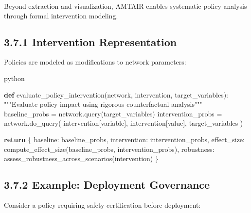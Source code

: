 \documentclass[
  11pt,
  letterpaper,
]{book}
\newenvironment{Shaded}{\begin{snugshade}}{\end{snugshade}}
\newcommand{\CommentTok}[1]{\textcolor[rgb]{0.37,0.37,0.37}{#1}}
\newcommand{\ControlFlowTok}[1]{\textcolor[rgb]{0.00,0.23,0.31}{\textbf{#1}}}
\newcommand{\KeywordTok}[1]{\textcolor[rgb]{0.00,0.23,0.31}{\textbf{#1}}}
\newcommand{\NormalTok}[1]{\textcolor[rgb]{0.00,0.23,0.31}{#1}}
\newcommand{\OperatorTok}[1]{\textcolor[rgb]{0.37,0.37,0.37}{#1}}
\newcommand{\StringTok}[1]{\textcolor[rgb]{0.13,0.47,0.30}{#1}}
\begin{document}

Beyond extraction and visualization, AMTAIR enables systematic policy
analysis through formal intervention modeling.

\subsection*{3.7.1 Intervention
Representation}\label{sec-intervention-representation}

Policies are modeled as modifications to network parameters:

python

\begin{Shaded}
\begin{Highlighting}[]
\KeywordTok{def}\NormalTok{ evaluate\_policy\_intervention(network, intervention, target\_variables):}
    \CommentTok{"""Evaluate policy impact using rigorous counterfactual analysis"""}
\NormalTok{    baseline\_probs }\OperatorTok{=}\NormalTok{ network.query(target\_variables)}
\NormalTok{    intervention\_probs }\OperatorTok{=}\NormalTok{ network.do\_query(}
\NormalTok{        intervention[}\StringTok{\textquotesingle{}variable\textquotesingle{}}\NormalTok{], }
\NormalTok{        intervention[}\StringTok{\textquotesingle{}value\textquotesingle{}}\NormalTok{],}
\NormalTok{        target\_variables}
\NormalTok{    )}
    
    \ControlFlowTok{return}\NormalTok{ \{}
        \StringTok{\textquotesingle{}baseline\textquotesingle{}}\NormalTok{: baseline\_probs,}
        \StringTok{\textquotesingle{}intervention\textquotesingle{}}\NormalTok{: intervention\_probs, }
        \StringTok{\textquotesingle{}effect\_size\textquotesingle{}}\NormalTok{: compute\_effect\_size(baseline\_probs, intervention\_probs),}
        \StringTok{\textquotesingle{}robustness\textquotesingle{}}\NormalTok{: assess\_robustness\_across\_scenarios(intervention)}
\NormalTok{    \}}
\end{Highlighting}
\end{Shaded}

\subsection*{3.7.2 Example: Deployment
Governance}\label{sec-deployment-example}

Consider a policy requiring safety certification before deployment:
\end{document}
